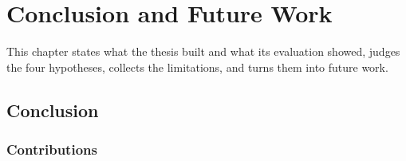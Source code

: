 
\chapter{Conclusion and Future Work}
\label{ch:conclusion}

This chapter states what the thesis built and what its evaluation showed, judges the four hypotheses, collects the limitations, and turns them into future work.

\section{Conclusion}
\label{sec:conclusion}

\subsection{Contributions}
\label{sec:concl-contributions}

